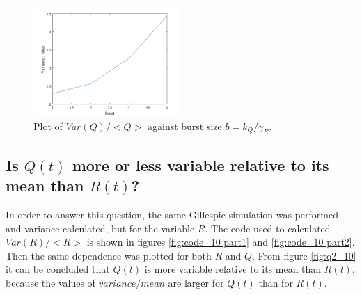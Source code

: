\documentclass[a4paper]{article}
\begin{document}
\begin{figure}
\centering
\includegraphics[width=0.5\textwidth]{q2_9.png}
\caption{\label{fig:q2_9} Plot of $Var(Q)/<Q>$ against burst size \(b = k_Q/\gamma_R\).} 
\end{figure}

\subsection{Is $Q(t)$ more or less variable relative to its mean than $R(t)$?}

In order to answer this question, the same Gillespie simulation was performed and variance calculated, but for the variable $R$. The code used to calculated $Var(R)/<R>$ is shown in figures \ref{fig:code_10 part1} and \ref{fig:code_10 part2}. Then the same dependence was plotted for both $R$ and $Q$. From figure \ref{fig:q2_10} it can be concluded that $Q(t)$ is more variable relative to its mean than $R(t)$, because the values of $variance/mean$ are larger for $Q(t)$ than for $R(t)$. 
\end{document}
